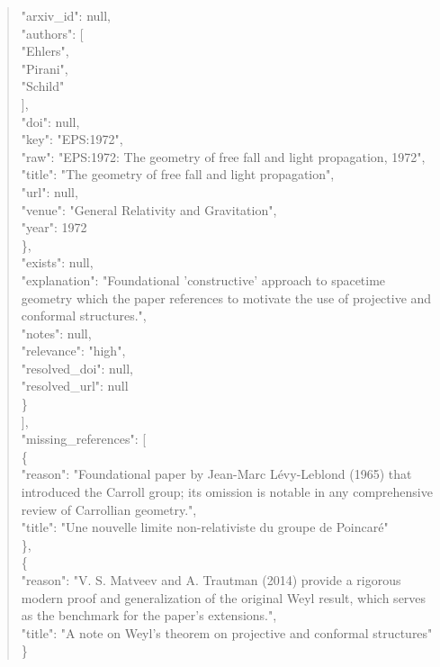 \documentclass[11pt]{article}
\begin{document}
\begin{quote}
        "arxiv\_id": null,\\
        "authors": [\\
          "Ehlers",\\
          "Pirani",\\
          "Schild"\\
        ],\\
        "doi": null,\\
        "key": "EPS:1972",\\
        "raw": "EPS:1972: The geometry of free fall and light propagation, 1972",\\
        "title": "The geometry of free fall and light propagation",\\
        "url": null,\\
        "venue": "General Relativity and Gravitation",\\
        "year": 1972\\
      \},\\
      "exists": null,\\
      "explanation": "Foundational 'constructive' approach to spacetime geometry which the paper references to motivate the use of projective and conformal structures.",\\
      "notes": null,\\
      "relevance": "high",\\
      "resolved\_doi": null,\\
      "resolved\_url": null\\
    \}\\
  ],\\
  "missing\_references": [\\
    \{\\
      "reason": "Foundational paper by Jean-Marc Lévy-Leblond (1965) that introduced the Carroll group; its omission is notable in any comprehensive review of Carrollian geometry.",\\
      "title": "Une nouvelle limite non-relativiste du groupe de Poincaré"\\
    \},\\
    \{\\
      "reason": "V. S. Matveev and A. Trautman (2014) provide a rigorous modern proof and generalization of the original Weyl result, which serves as the benchmark for the paper's extensions.",\\
      "title": "A note on Weyl's theorem on projective and conformal structures"\\
    \}\\

\end{quote}
\end{document}
